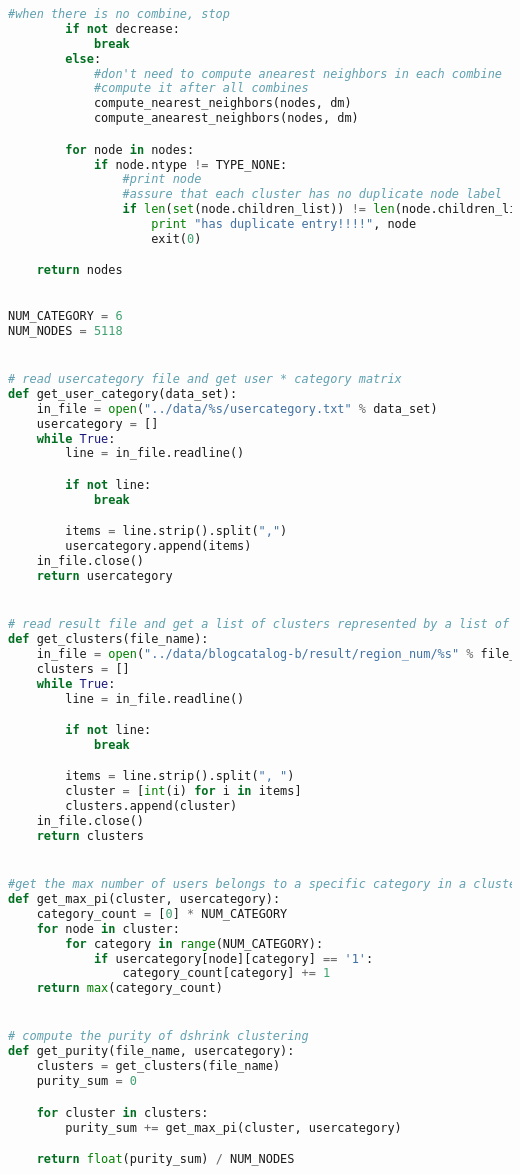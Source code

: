 \begin{lstlisting}[language={python}, caption={DSHRINK算法}, label=code:dshrink]
        #when there is no combine, stop
        if not decrease:
            break
        else:
            #don't need to compute anearest neighbors in each combine
            #compute it after all combines
            compute_nearest_neighbors(nodes, dm)
            compute_anearest_neighbors(nodes, dm)

        for node in nodes:
            if node.ntype != TYPE_NONE:
                #print node
                #assure that each cluster has no duplicate node label
                if len(set(node.children_list)) != len(node.children_list):
                    print "has duplicate entry!!!!", node
                    exit(0)

    return nodes
\end{lstlisting}

\begin{lstlisting}[language={python}, caption={计算聚类的纯度}, label=code:purity]

NUM_CATEGORY = 6
NUM_NODES = 5118


# read usercategory file and get user * category matrix
def get_user_category(data_set):
    in_file = open("../data/%s/usercategory.txt" % data_set)
    usercategory = []
    while True:
        line = in_file.readline()

        if not line:
            break

        items = line.strip().split(",")
        usercategory.append(items)
    in_file.close()
    return usercategory


# read result file and get a list of clusters represented by a list of user id
def get_clusters(file_name):
    in_file = open("../data/blogcatalog-b/result/region_num/%s" % file_name)
    clusters = []
    while True:
        line = in_file.readline()

        if not line:
            break

        items = line.strip().split(", ")
        cluster = [int(i) for i in items]
        clusters.append(cluster)
    in_file.close()
    return clusters


#get the max number of users belongs to a specific category in a cluster
def get_max_pi(cluster, usercategory):
    category_count = [0] * NUM_CATEGORY
    for node in cluster:
        for category in range(NUM_CATEGORY):
            if usercategory[node][category] == '1':
                category_count[category] += 1
    return max(category_count)


# compute the purity of dshrink clustering
def get_purity(file_name, usercategory):
    clusters = get_clusters(file_name)
    purity_sum = 0

    for cluster in clusters:
        purity_sum += get_max_pi(cluster, usercategory)

    return float(purity_sum) / NUM_NODES
\end{lstlisting}


